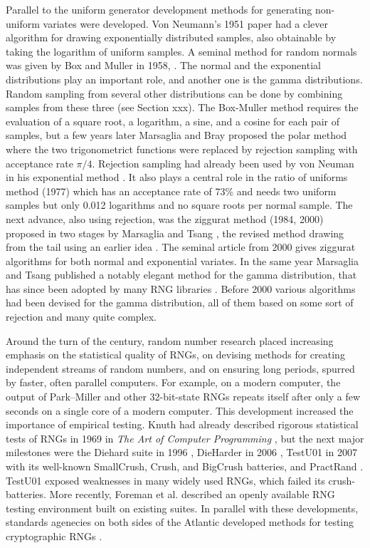 \documentclass[manuscript,screen,review]{acmart}
\begin{document}
Parallel to the uniform generator development methods for generating
non-uniform variates were developed. Von Neumann's 1951 paper
\cite{vonneumann1951rejection} had a clever algorithm for drawing
exponentially distributed samples, also obtainable by taking the
logarithm of uniform samples. A seminal method for random normals was
given by Box and Muller in 1958, \cite{box1958normal}. The normal and
the exponential distributions play an important role, and another one
is the gamma distributions. Random sampling from several other
distributions can be done by combining samples from these three (see
Section xxx). The Box-Muller method requires the evaluation of a
square root, a logarithm, a sine, and a cosine for each pair of
samples, but a few years later Marsaglia and Bray proposed the polar
method where the two trigonometrict functions were replaced by
rejection sampling with acceptance rate $\pi/4$. Rejection sampling
had already been used by von Neuman in his exponential method
\cite{vonneumann1951rejection}. It also plays a central role in the
ratio of uniforms method (1977) \cite{kinderman1977ratio,leva1992fast}
which has an acceptance rate of 73\% and needs two uniform samples but
only 0.012 logarithms and no square roots per normal sample. The next
advance, also using rejection, was the ziggurat method (1984, 2000)
proposed in two stages by Marsaglia and Tsang
\cite{marsaglia1984fast,marsaglia2000ziggurat}, the revised method
drawing from the tail using an earlier idea \cite{marsaglia1964tail}.
The seminal article from 2000 gives ziggurat algorithms for both
normal and exponential variates. In the same year Marsaglia and Tsang
published a notably elegant method for the gamma distribution, that
has since been adopted by many RNG libraries
\cite{marsaglia2000gamma}. Before 2000 various algorithms had been
devised for the gamma distribution, all of them based on some sort of
rejection and many quite complex.

Around the turn of the century, random number research placed
increasing emphasis on the statistical quality of RNGs, on devising
methods for creating independent streams of random numbers, and on
ensuring long periods, spurred by faster, often parallel computers.
For example, on a modern computer, the output of Park–Miller and other
32-bit-state RNGs repeats itself after only a few seconds on a single
core of a modern computer. This development increased the importance
of empirical testing. Knuth had already described rigorous statistical
tests of RNGs in 1969 in \emph{The Art of Computer Programming}
\cite{knuth1969art}, but the next major milestones were the Diehard
suite in 1996 \cite{marsaglia1996diehard}, DieHarder in 2006
\cite{Brown2006DieHarder}, TestU01 in 2007 \cite{lecuyer2007testu01}
with its well-known SmallCrush, Crush, and BigCrush batteries, and
PractRand \cite{dotyhumphrey2010pract}. TestU01 exposed weaknesses
in many widely used RNGs, which failed its crush-batteries. More
recently, Foreman et al. \cite{foreman2024statistical} described an
openly available RNG testing environment built on existing suites. In
parallel with these developments, standards agenecies on both sides of
the Atlantic developed methods for testing cryptographic RNGs
\cite{schindler2002evaluation,rukhin2010nist,saarinen2022sp}.
\end{document}
